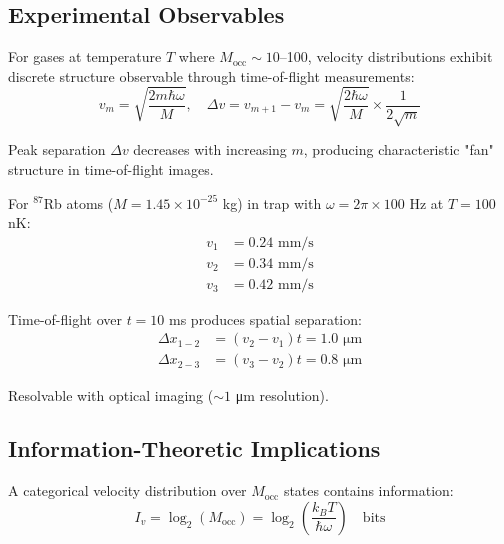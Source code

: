 \begin{definition}
\subsection{Experimental Observables}

\begin{theorem}
\label{thm:velocity_quantization}
For gases at temperature $T$ where $M_{\text{occ}} \sim 10$--100, velocity distributions exhibit discrete structure observable through time-of-flight measurements:
\begin{equation}
v_m = \sqrt{\frac{2m\hbar\omega}{M}}, \quad \Delta v = v_{m+1} - v_m = \sqrt{\frac{2\hbar\omega}{M}} \times \frac{1}{2\sqrt{m}}
\end{equation}
\end{theorem}

Peak separation $\Delta v$ decreases with increasing $m$, producing characteristic "fan" structure in time-of-flight images.

\begin{example}
\label{ex:bec_expansion}
For $^{87}$Rb atoms ($M = 1.45 \times 10^{-25}$ kg) in trap with $\omega = 2\pi \times 100$ Hz at $T = 100$ nK:
\begin{align}
v_1 &= 0.24 \text{ mm/s} \\
v_2 &= 0.34 \text{ mm/s} \\
v_3 &= 0.42 \text{ mm/s}
\end{align}

Time-of-flight over $t = 10$ ms produces spatial separation:
\begin{align}
\Delta x_{1-2} &= (v_2 - v_1)t = 1.0 \text{ μm} \\
\Delta x_{2-3} &= (v_3 - v_2)t = 0.8 \text{ μm}
\end{align}

Resolvable with optical imaging ($\sim 1$ μm resolution).
\end{example}

\subsection{Information-Theoretic Implications}

\begin{proposition}
\label{prop:velocity_information}
A categorical velocity distribution over $M_{\text{occ}}$ states contains information:
\begin{equation}
I_v = \log_2(M_{\text{occ}}) = \log_2\left(\frac{k_BT}{\hbar\omega}\right) \quad \text{bits}
\end{equation}


\end{proposition}
\end{definition}
